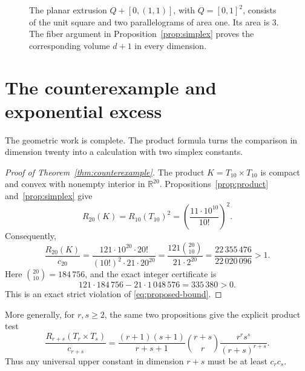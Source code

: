 \documentclass[11pt]{article}
\newcommand{\R}{\mathbb R}
\begin{document}
\begin{figure}[tb]
\centering
{}
\caption{The planar extrusion \(Q+[0,(1,1)]\), with
\(Q=[0,1]^2\), consists of the unit square and two parallelograms of
area one. Its area is \(3\). The fiber argument in
Proposition~\ref{prop:simplex} proves the corresponding volume \(d+1\)
in every dimension.}
\label{fig:extrusion}
\end{figure}

\section{The counterexample and exponential excess}\label{sec:counterexample}

The geometric work is complete. The product formula turns the comparison
in dimension twenty into a calculation with two simplex constants.

\begin{proof}[Proof of Theorem~\ref{thm:counterexample}]
The product \(K=T_{10}\times T_{10}\) is compact and convex with
nonempty interior in \(\R^{20}\). Propositions~\ref{prop:product}
and~\ref{prop:simplex} give
\[
 R_{20}(K)=R_{10}(T_{10})^2
         =\left(\frac{11\cdot10^{10}}{10!}\right)^2.
\]
Consequently,
\[
 \frac{R_{20}(K)}{c_{20}}
 =\frac{121\cdot10^{20}\cdot20!}
        {(10!)^2\cdot21\cdot20^{20}}
 =\frac{121\binom{20}{10}}{21\cdot2^{20}}
 =\frac{22\,355\,476}{22\,020\,096}>1.
\]
Here \(\binom{20}{10}=184\,756\), and the exact integer certificate is
\[
 121\cdot184\,756-21\cdot1\,048\,576=335\,380>0.
\]
This is an exact strict violation of \eqref{eq:proposed-bound}.
\end{proof}

More generally, for \(r,s\ge2\), the same two propositions give the
explicit product test
\[
 \frac{R_{r+s}(T_r\times T_s)}{c_{r+s}}
 =\frac{(r+1)(s+1)}{r+s+1}
   \binom{r+s}{r}\frac{r^rs^s}{(r+s)^{r+s}}.
\]
Thus any universal upper constant in dimension \(r+s\) must be at least
\(c_rc_s\).
\end{document}
